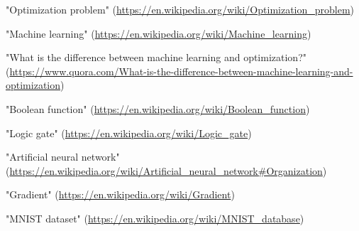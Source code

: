 \documentclass{article}
\theoremstyle{definition}
\begin{document}
\newpage
\begin{thebibliography}{100}

"Optimization problem" (\url{https://en.wikipedia.org/wiki/Optimization_problem})

"Machine learning" (\url{https://en.wikipedia.org/wiki/Machine_learning})

"What is the difference between machine learning and optimization?" (\url{https://www.quora.com/What-is-the-difference-between-machine-learning-and-optimization})

"Boolean function" (\url{https://en.wikipedia.org/wiki/Boolean_function})

"Logic gate" (\url{https://en.wikipedia.org/wiki/Logic_gate})

"Artificial neural network" (\url{https://en.wikipedia.org/wiki/Artificial_neural_network#Organization})

"Gradient" (\url{https://en.wikipedia.org/wiki/Gradient})

"MNIST dataset" (\url{https://en.wikipedia.org/wiki/MNIST_database})

\end{thebibliography}

\end{document}
